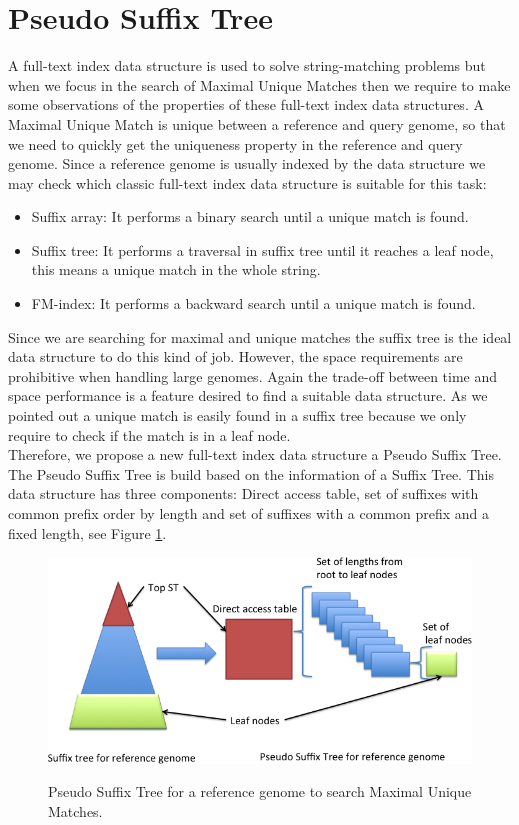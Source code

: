 \documentclass[runningheads,a4paper]{llncs}
\begin{document}
{\section{Pseudo Suffix Tree}
A full-text index data structure is used to solve string-matching problems but when we focus in the search of Maximal Unique Matches then we require to make some observations of the properties of these full-text index data structures. A Maximal Unique Match is unique between a reference and query genome, so that we need to quickly get the uniqueness property in the reference and query genome. Since a reference genome is usually indexed by the data structure we may check which classic full-text index data structure is suitable for this task:
\begin{itemize}
  \item Suffix array: It performs a binary search until a unique match is found.
  \item Suffix tree: It performs a traversal in suffix tree until it reaches a leaf node, this means a unique match in the whole string.
  \item FM-index: It performs a backward search until a unique match is found.
\end{itemize}
Since we are searching for maximal and unique matches the suffix tree is the ideal data structure to do this kind of job. However, the space requirements are prohibitive when handling large genomes. Again the trade-off between time and space performance is a feature desired to find a suitable data structure. As we pointed out a unique match is easily found in a suffix tree because we only require to check if the match is in a leaf node.\\
Therefore, we propose a new full-text index data structure a Pseudo Suffix Tree. The Pseudo Suffix Tree is build based on the information of a Suffix Tree. This data structure has three components: Direct access table, set of suffixes with common prefix order by length and set of suffixes with a common prefix and a fixed length, see Figure \ref{fig:pseudo}.
\begin{figure}
\centering
\includegraphics[scale=0.5]{pseudoST.png}
\label{fig:pseudo}
\caption{Pseudo Suffix Tree for a reference genome to search Maximal Unique Matches.}
\end{figure}
}
\end{document}
